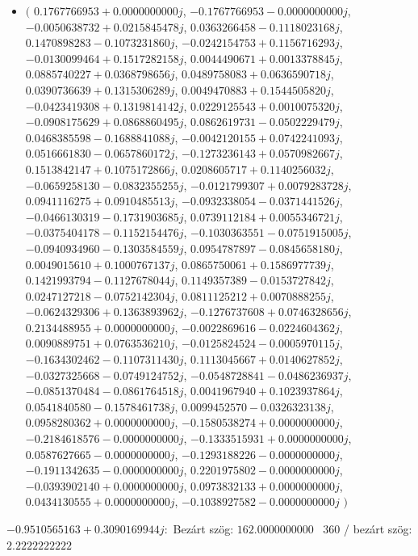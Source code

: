 \documentclass[14pt,a4paper]{article}
\begin{document}
\begin{itemize}
\item
$\big($
$0.1767766953+0.0000000000j$, $-0.1767766953-0.0000000000j$, $-0.0050638732+0.0215845478j$, $0.0363266458-0.1118023168j$, $0.1470898283-0.1073231860j$, $-0.0242154753+0.1156716293j$, $-0.0130099464+0.1517282158j$, $0.0044490671+0.0013378845j$, $0.0885740227+0.0368798656j$, $0.0489758083+0.0636590718j$, $0.0390736639+0.1315306289j$, $0.0049470883+0.1544505820j$, $-0.0423419308+0.1319814142j$, $0.0229125543+0.0010075320j$, $-0.0908175629+0.0868860495j$, $0.0862619731-0.0502229479j$, $0.0468385598-0.1688841088j$, $-0.0042120155+0.0742241093j$, $0.0516661830-0.0657860172j$, $-0.1273236143+0.0570982667j$, $0.1513842147+0.1075172866j$, $0.0208605717+0.1140256032j$, $-0.0659258130-0.0832355255j$, $-0.0121799307+0.0079283728j$, $0.0941116275+0.0910485513j$, $-0.0932338054-0.0371441526j$, $-0.0466130319-0.1731903685j$, $0.0739112184+0.0055346721j$, $-0.0375404178-0.1152154476j$, $-0.1030363551-0.0751915005j$, $-0.0940934960-0.1303584559j$, $0.0954787897-0.0845658180j$, $0.0049015610+0.1000767137j$, $0.0865750061+0.1586977739j$, $0.1421993794-0.1127678044j$, $0.1149357389-0.0153727842j$, $0.0247127218-0.0752142304j$, $0.0811125212+0.0070888255j$, $-0.0624329306+0.1363893962j$, $-0.1276737608+0.0746328656j$, $0.2134488955+0.0000000000j$, $-0.0022869616-0.0224604362j$, $0.0090889751+0.0763536210j$, $-0.0125824524-0.0005970115j$, $-0.1634302462-0.1107311430j$, $0.1113045667+0.0140627852j$, $-0.0327325668-0.0749124752j$, $-0.0548728841-0.0486236937j$, $-0.0851370484-0.0861764518j$, $0.0041967940+0.1023937864j$, $0.0541840580-0.1578461738j$, $0.0099452570-0.0326323138j$, $0.0958280362+0.0000000000j$, $-0.1580538274+0.0000000000j$, $-0.2184618576-0.0000000000j$, $-0.1333515931+0.0000000000j$, $0.0587627665-0.0000000000j$, $-0.1293188226-0.0000000000j$, $-0.1911342635-0.0000000000j$, $0.2201975802-0.0000000000j$, $-0.0393902140+0.0000000000j$, $0.0973832133+0.0000000000j$, $0.0434130555+0.0000000000j$, $-0.1038927582-0.0000000000j$
$\big)$
\end{itemize}
$-0.9510565163+0.3090169944j$:\
Bezárt szög: $162.0000000000$ \
360 / bezárt szög: $2.2222222222$\
\end{document}
